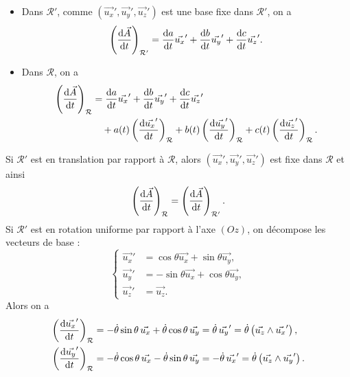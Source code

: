         \begin{itemize}
            \item Dans $\mathcal{R}'$, comme $(\vec{u_x}',\vec{u_y}',\vec{u_z}')$ est une base fixe dans $\mathcal{R}'$, on a 
            \begin{equation}
                \left(\frac{\mathrm{d}\vec{A}}{\mathrm{d} t}\right)_{\mathcal{R}'}=\dfrac{\mathrm{d} a}{\mathrm{d} t}\vec{u_x}'+\dfrac{\mathrm{d} b}{\mathrm{d} t}\vec{u_y}'+\dfrac{\mathrm{d} c}{\mathrm{d} t}\vec{u_z}'.
            \end{equation}
            \item Dans $\mathcal{R}$, on a 
            \begin{align}
                \left(\frac{\mathrm{d}\vec{A}}{\mathrm{d} t}\right)_{\mathcal{R}}
                &=\frac{\mathrm{d} a}{\mathrm{d} t}\vec{u_x}'+\frac{\mathrm{d} b}{\mathrm{d} t}\vec{u_y}'+\frac{\mathrm{d} c}{\mathrm{d} t}\vec{u_z}'\\
                &\quad+a(t)\left(\frac{\mathrm{d}\vec{u_x}'}{\mathrm{d} t}\right)_{\mathcal{R}}+b(t)\left(\frac{\mathrm{d}\vec{u_y}'}{\mathrm{d} t}\right)_{\mathcal{R}}+c(t)\left(\frac{\mathrm{d}\vec{u_z}'}{\mathrm{d} t}\right)_{\mathcal{R}}.
            \end{align}
        \end{itemize}
        Si $\mathcal{R}'$ est en translation par rapport à $\mathcal{R}$, alors $(\vec{u_x}',\vec{u_y}',\vec{u_z}')$ est fixe dans $\mathcal{R}$ et ainsi 
        \begin{equation}
            \left(\dfrac{\mathrm{d}\vec{A}}{\mathrm{d} t}\right)_{\mathcal{R}}=\left(\dfrac{\mathrm{d}\vec{A}}{\mathrm{d} t}\right)_{\mathcal{R}'}.
        \end{equation}
        Si $\mathcal{R}'$ est en rotation uniforme par rapport à l'axe $(Oz)$, on décompose les vecteurs de base :
        \begin{equation}
            \left\lbrace
            \begin{aligned}
                \vec{u_x}' &= \cos\theta\vec{u_x}+\sin\theta\vec{u_y},\\
                \vec{u_y}' &= -\sin\theta\vec{u_x}+\cos\theta\vec{u_y},\\
                \vec{u_z}' &= \vec{u_z}.
            \end{aligned}
            \right.
        \end{equation}
        Alors on a 
        \begin{equation}
            \begin{aligned}
                \left(\frac{\mathrm{d}\vec{u_x}'}{\mathrm{d} t}\right)_{\mathcal{R}} &= -\dot{\theta}\sin\theta\,\vec{u_x}+\dot{\theta}\cos\theta\,\vec{u_y}=\dot{\theta}\,\vec{u_y}'=\dot{\theta}\left(\vec{u_z}\wedge\vec{u_x}'\right),\\
                \left(\frac{\mathrm{d}\vec{u_y}'}{\mathrm{d} t}\right)_{\mathcal{R}} &= -\dot{\theta}\cos\theta\,\vec{u_x}-\dot{\theta}\sin\theta\,\vec{u_y}=-\dot{\theta}\,\vec{u_x}'=\dot{\theta}\left(\vec{u_z}\wedge\vec{u_y}'\right).
            \end{aligned}
        \end{equation}
